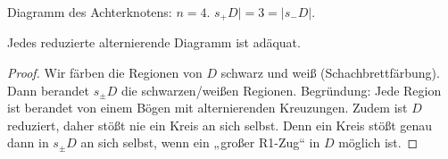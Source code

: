 \begin{ex}
    Diagramm des Achterknotens: $n = 4$.
    $s_+ D| = 3 = |s_- D|$.
\end{ex}

\begin{lem}
    Jedes reduzierte alternierende Diagramm ist adäquat.
    \begin{proof}
        Wir färben die Regionen von $D$ schwarz und weiß (Schachbrettfärbung).
        Dann berandet $s_\pm D$ die schwarzen/weißen Regionen.
        Begründung: Jede Region ist berandet von einem Bögen mit alternierenden Kreuzungen.
        Zudem ist $D$ reduziert, daher stößt nie ein Kreis an sich selbst.
        Denn ein Kreis stößt genau dann in $s_\pm D$ an sich selbst, wenn ein „großer R1-Zug“ in $D$ möglich ist.
    \end{proof}
\end{lem}

